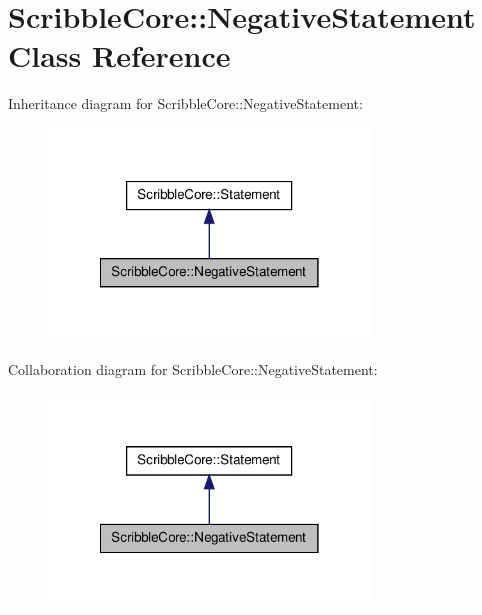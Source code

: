 \hypertarget{class_scribble_core_1_1_negative_statement}{\section{Scribble\-Core\-:\-:Negative\-Statement Class Reference}
\label{class_scribble_core_1_1_negative_statement}
}


Inheritance diagram for Scribble\-Core\-:\-:Negative\-Statement\-:
\nopagebreak
\begin{figure}[H]
\begin{center}
\leavevmode
\includegraphics[width=242pt]{class_scribble_core_1_1_negative_statement__inherit__graph}
\end{center}
\end{figure}


Collaboration diagram for Scribble\-Core\-:\-:Negative\-Statement\-:
\nopagebreak
\begin{figure}[H]
\begin{center}
\leavevmode
\includegraphics[width=242pt]{class_scribble_core_1_1_negative_statement__coll__graph}
\end{center}
\end{figure}
